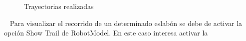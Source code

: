 \begin{figure} [ht!]
    \centering  
    \hspace{2cm}
    \hspace{2cm}
    \hspace{2cm}
    \caption{Trayectorias realizadas}
    \label{fig:trayectorias}
\end{figure}\ 
\newpage
Para visualizar el recorrido de un determinado eslabón se debe de activar la opción Show Trail de RobotModel. En este caso interesa activar la 
